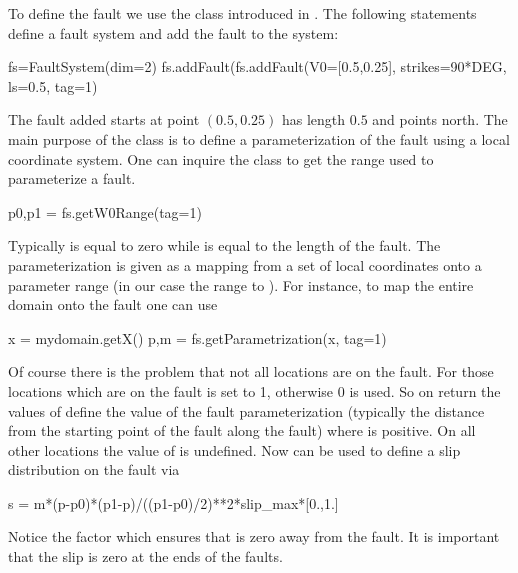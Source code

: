 To define the fault we use the  class introduced in .
The following statements define a fault system  and add the fault  to the system:
\begin{python}
  fs=FaultSystem(dim=2)
  fs.addFault(fs.addFault(V0=[0.5,0.25], strikes=90*DEG, ls=0.5, tag=1)
\end{python}
The fault added starts at point $(0.5,0.25)$ has length $0.5$ and points north.
The main purpose of the  class is to define a
parameterization of the fault using a local coordinate system.
One can inquire the class to get the range used to parameterize a fault.
\begin{python}
  p0,p1 = fs.getW0Range(tag=1)
\end{python}
Typically  is equal to zero while  is equal to the length of the fault.
The parameterization is given as a mapping from a set of local coordinates
onto a parameter range (in our case the range  to ).
For instance, to map the entire domain  onto the fault one can
use
\begin{python}
  x = mydomain.getX()
  p,m = fs.getParametrization(x, tag=1)
\end{python}
Of course there is the problem that not all locations are on the fault.
For those locations which are on the fault  is set to 1, otherwise 0 is used.
So on return the values of  define the value of the fault parameterization
(typically the distance from the starting point of the fault along the fault)
where  is positive.
On all other locations the value of  is undefined.
Now  can be used to define a slip distribution on the fault via
\begin{python}
  s = m*(p-p0)*(p1-p)/((p1-p0)/2)**2*slip_max*[0.,1.]
\end{python}
Notice the factor  which ensures that  is zero away from the fault.
It is important that the slip is zero at the ends of the faults.

